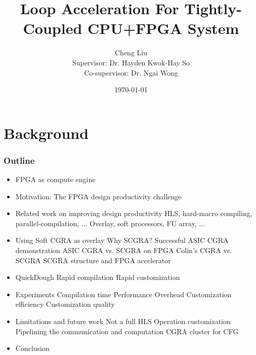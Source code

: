 \documentclass{beamer}
\title[]{Loop Acceleration For Tightly-Coupled CPU+FPGA System}
\author[]{
    Cheng Liu 
    \\Supervisor: Dr. Hayden Kwok-Hay So 
    \\Co-supervisor: Dr. Ngai Wong}
\institute {
    Department of Electrical and Electronic Engineering 
    \\The University of Hong Kong
\medskip
}
\date{\today} %
\begin{document}
\begin{frame}
\titlepage %
\end{frame}


\section{Background} 
\begin{frame}[t]
\frametitle{Outline}

\begin{itemize}
\item FPGA as compute engine 
\item Motivation: The FPGA design productivity challenge
\item Related work on improving design productivity
    \subitem HLS, hard-macro compiling, parallel-compilation, ...
    \subitem Overlay, soft processors, FU array, ...
\item Using Soft CGRA as overlay
    \subitem Why SCGRA? Successful ASIC CGRA demonstration 
    \subitem ASIC CGRA vs. SCGRA on FPGA
    \subitem Colin's CGRA vs. SCGRA
    \subitem SCGRA structure and FPGA accelerator
\item QuickDough
    \subitem Rapid compilation
    \subitem Rapid customization
\item Experiments
    \subitem Compilation time
    \subitem Performance
    \subitem Overhead
    \subitem Customization efficiency
    \subitem Customization quality
\item Limitations and future work
    \subitem Not a full HLS
    \subitem Operation customization
    \subitem Pipelining the communication and computation
    \subitem CGRA cluster for CFG
\item Conclusion

\end{itemize}

\end{frame}
\end{document}
